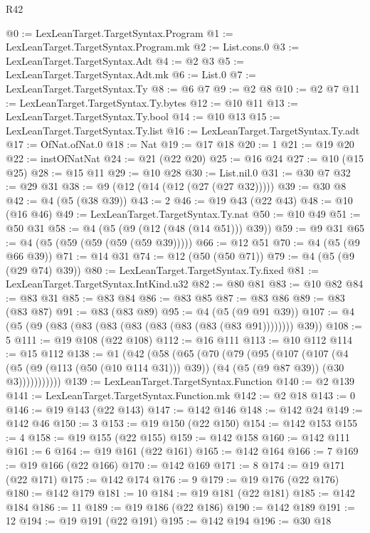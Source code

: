 \begin{lexlean}{R42}
\begin{coremodule}
@0 := LexLeanTarget.TargetSyntax.Program
@1 := LexLeanTarget.TargetSyntax.Program.mk
@2 := List.cons.{0}
@3 := LexLeanTarget.TargetSyntax.Adt
@4 := @2 @3
@5 := LexLeanTarget.TargetSyntax.Adt.mk
@6 := List.{0}
@7 := LexLeanTarget.TargetSyntax.Ty
@8 := @6 @7
@9 := @2 @8
@10 := @2 @7
@11 := LexLeanTarget.TargetSyntax.Ty.bytes
@12 := @10 @11
@13 := LexLeanTarget.TargetSyntax.Ty.bool
@14 := @10 @13
@15 := LexLeanTarget.TargetSyntax.Ty.list
@16 := LexLeanTarget.TargetSyntax.Ty.adt
@17 := OfNat.ofNat.{0}
@18 := Nat
@19 := @17 @18
@20 := 1
@21 := @19 @20
@22 := instOfNatNat
@24 := @21 (@22 @20)
@25 := @16 @24
@27 := @10 (@15 @25)
@28 := @15 @11
@29 := @10 @28
@30 := List.nil.{0}
@31 := @30 @7
@32 := @29 @31
@38 := @9 (@12 (@14 (@12 (@27 (@27 @32)))))
@39 := @30 @8
@42 := @4 (@5 (@38 @39))
@43 := 2
@46 := @19 @43 (@22 @43)
@48 := @10 (@16 @46)
@49 := LexLeanTarget.TargetSyntax.Ty.nat
@50 := @10 @49
@51 := @50 @31
@58 := @4 (@5 (@9 (@12 (@48 (@14 @51))) @39))
@59 := @9 @31
@65 := @4 (@5 (@59 (@59 (@59 (@59 @39)))))
@66 := @12 @51
@70 := @4 (@5 (@9 @66 @39))
@71 := @14 @31
@74 := @12 (@50 (@50 @71))
@79 := @4 (@5 (@9 (@29 @74) @39))
@80 := LexLeanTarget.TargetSyntax.Ty.fixed
@81 := LexLeanTarget.TargetSyntax.IntKind.u32
@82 := @80 @81
@83 := @10 @82
@84 := @83 @31
@85 := @83 @84
@86 := @83 @85
@87 := @83 @86
@89 := @83 (@83 @87)
@91 := @83 (@83 @89)
@95 := @4 (@5 (@9 @91 @39))
@107 := @4 (@5 (@9 (@83 (@83 (@83 (@83 (@83 (@83 (@83 (@83 @91)))))))) @39))
@108 := 5
@111 := @19 @108 (@22 @108)
@112 := @16 @111
@113 := @10 @112
@114 := @15 @112
@138 := @1
    (@42
      (@58
        (@65
          (@70
            (@79
              (@95
                (@107
                  (@107
                    (@4
                      (@5 (@9 (@113 (@50 (@10 @114 @31))) @39))
                      (@4 (@5 (@9 @87 @39)) (@30 @3)))))))))))
@139 := LexLeanTarget.TargetSyntax.Function
@140 := @2 @139
@141 := LexLeanTarget.TargetSyntax.Function.mk
@142 := @2 @18
@143 := 0
@146 := @19 @143 (@22 @143)
@147 := @142 @146
@148 := @142 @24
@149 := @142 @46
@150 := 3
@153 := @19 @150 (@22 @150)
@154 := @142 @153
@155 := 4
@158 := @19 @155 (@22 @155)
@159 := @142 @158
@160 := @142 @111
@161 := 6
@164 := @19 @161 (@22 @161)
@165 := @142 @164
@166 := 7
@169 := @19 @166 (@22 @166)
@170 := @142 @169
@171 := 8
@174 := @19 @171 (@22 @171)
@175 := @142 @174
@176 := 9
@179 := @19 @176 (@22 @176)
@180 := @142 @179
@181 := 10
@184 := @19 @181 (@22 @181)
@185 := @142 @184
@186 := 11
@189 := @19 @186 (@22 @186)
@190 := @142 @189
@191 := 12
@194 := @19 @191 (@22 @191)
@195 := @142 @194
@196 := @30 @18

\end{coremodule}
\end{lexlean}
